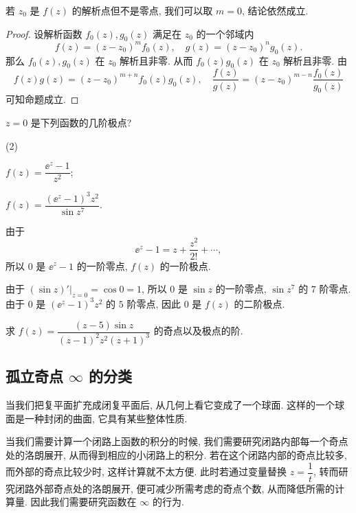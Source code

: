 若 $z_0$ 是 $f(z)$ 的解析点但不是零点, 我们可以取 $m=0$, 结论依然成立.

\begin{proof}
  设解析函数 $f_0(z),g_0(z)$ 满足在 $z_0$ 的一个邻域内
  \[
    f(z)=(z-z_0)^mf_0(z),\quad 
    g(z)=(z-z_0)^ng_0(z).
  \]
  那么 $f_0(z),g_0(z)$ 在 $z_0$ 解析且非零.
  从而 $f_0(z)g_0(z)$ 在 $z_0$ 解析且非零.
  由
  \[
    f(z)g(z)=(z-z_0)^{m+n}f_0(z)g_0(z),\quad
    \frac{f(z)}{g(z)}=(z-z_0)^{m-n}\frac{f_0(z)}{g_0(z)}
  \]
  可知命题成立.
\end{proof}

\begin{example}
  $z=0$ 是下列函数的几阶极点?
  \begin{subexample}(2)
    \item $f(z)=\dfrac{\ee^z-1}{z^2}$;
    \item $f(z)=\dfrac{(\ee^z-1)^3z^2}{\sin z^7}$.
  \end{subexample}
\end{example}

\begin{solution}\delspace
  \begin{enumnopar}[(i)]
    \item 由于
      \[
        \ee^z-1=z+\dfrac{z^2}{2!}+\cdots,
      \]
      所以 $0$ 是 $\ee^z-1$ 的一阶零点, $f(z)$ 的一阶极点.
    \item 由于 $(\sin z)'|_{z=0}=\cos 0=1$, 所以 $0$ 是 $\sin z$ 的一阶零点, $\sin z^7$ 的 $7$ 阶零点.
      由于 $0$ 是 $(\ee^z-1)^3z^2$ 的 $5$ 阶零点, 因此 $0$ 是 $f(z)$ 的二阶极点.
  \end{enumnopar}
\end{solution}

\begin{exercise}
  求 $f(z)=\dfrac{(z-5)\sin z}{(z-1)^2z^2(z+1)^3}$ 的奇点以及极点的阶.
\end{exercise}


\subsection{孤立奇点 \texorpdfstring{$\infty$}{∞} 的分类}

当我们把复平面扩充成闭复平面后, 从几何上看它变成了一个球面.
这样的一个球面是一种封闭的曲面, 它具有某些整体性质.

当我们需要计算一个闭路上函数的积分的时候,
我们需要研究闭路内部每一个奇点处的洛朗展开,
从而得到相应的小闭路上的积分.
若在这个闭路内部的奇点比较多, 而外部的奇点比较少时, 这样计算就不太方便.
此时若通过变量替换 $z=\dfrac1t$, 转而研究闭路外部奇点处的洛朗展开, 便可减少所需考虑的奇点个数, 从而降低所需的计算量.
因此我们需要研究函数在 $\infty$ 的行为.

